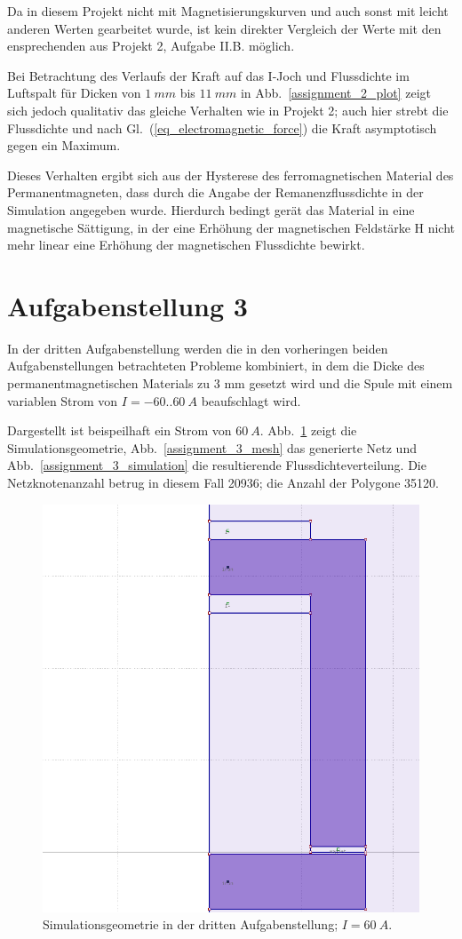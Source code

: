 \documentclass[conference,a4paper,twoside]{IEEEtran}
\begin{document}
Da in diesem Projekt nicht mit Magnetisierungskurven und auch sonst mit leicht anderen Werten gearbeitet wurde, ist kein direkter Vergleich der Werte mit den ensprechenden aus Projekt 2, Aufgabe II.B. möglich.

Bei Betrachtung des Verlaufs der Kraft auf das I-Joch und Flussdichte im Luftspalt für Dicken von $1\ mm$ bis $11\ mm$ in Abb.~\ref{assignment_2_plot} zeigt sich jedoch qualitativ das gleiche Verhalten wie in Projekt 2; auch hier strebt die Flussdichte und nach Gl.~(\ref{eq_electromagnetic_force}) die Kraft asymptotisch gegen ein Maximum.

Dieses Verhalten ergibt sich aus der Hysterese des ferromagnetischen Material des Permanentmagneten, dass durch die Angabe der Remanenzflussdichte in der Simulation angegeben wurde. Hierdurch bedingt gerät das Material in eine magnetische Sättigung, in der eine Erhöhung der magnetischen Feldstärke H nicht mehr linear eine Erhöhung der magnetischen Flussdichte bewirkt.

\section{Aufgabenstellung 3}

In der dritten Aufgabenstellung werden die in den vorheringen beiden Aufgabenstellungen betrachteten Probleme kombiniert, in dem die Dicke des permanentmagnetischen Materials zu 3 mm gesetzt wird und die Spule mit einem variablen Strom von $I = -60 .. 60\ A$ beaufschlagt wird.

Dargestellt ist beispeilhaft ein Strom von $60\ A$. Abb.~\ref{assignment_3_geometry} zeigt die Simulationsgeometrie, Abb.~\ref{assignment_3_mesh} das generierte Netz und Abb.~\ref{assignment_3_simulation} die resultierende Flussdichteverteilung. Die Netzknotenanzahl betrug in diesem Fall 20936; die Anzahl der Polygone 35120.

\begin{figure}
\centerline{\includegraphics[width=0.7\columnwidth]{../assets/assignment_3_geometry.png}}
\caption{Simulationsgeometrie in der dritten Aufgabenstellung; $I = 60\ A$.}
\label{assignment_3_geometry}
\end{figure}
\end{document}
